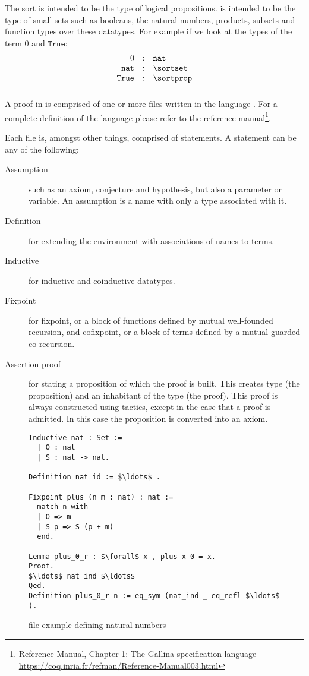 The sort \sortprop is intended to be the type of logical propositions.
\sortset is intended to be the type of small sets such as booleans, the natural numbers, products, subsets and function types over these datatypes.
For example if we look at the types of the term $0$ and $\texttt{True}$:
	\[
		\begin{array}{rcl}
			0 & : & \texttt{nat} \\
			\texttt{nat} & : & \sortset \\
			\texttt{True} & : & \sortprop
		\end{array}
	\]

\subsubsection{\gallina}

A proof in \coq is comprised of one or more files written in the \gallina language \cite{huet1992gallina}.
For a complete definition of the \gallina language please refer to the \coq reference manual\footnote{\coq Reference Manual, Chapter 1: The Gallina specification language\\ \url{https://coq.inria.fr/refman/Reference-Manual003.html}}.

Each file is, amongst other things, comprised of statements.
A statement can be any of the following:
\begin{description}
	\item[Assumption] such as an axiom, conjecture and hypothesis, but also a parameter or variable.
		An assumption is a name with only a type associated with it.
	\item[Definition] for extending the environment with associations of names to terms.
	\item[Inductive] for inductive and coinductive datatypes.
	\item[Fixpoint] for fixpoint, or a block of functions defined by mutual well-founded recursion, and cofixpoint, or a block of terms defined by a mutual guarded co-recursion.
	\item[Assertion proof] for stating a proposition of which the proof is built.
		This creates type (the proposition) and an inhabitant of the type (the proof).
		This proof is always constructed using tactics, except in the case that a proof is admitted.
		In this case the proposition is converted into an axiom.
\end{description}

\begin{figure}[H]
	\begin{lstlisting}[language=Coq, mathescape]
Inductive nat : Set :=
  | O : nat
  | S : nat -> nat.

Definition nat_id := $\ldots$ .

Fixpoint plus (n m : nat) : nat :=
  match n with
  | O => m
  | S p => S (p + m)
  end.

Lemma plus_0_r : $\forall$ x , plus x 0 = x.
Proof.
$\ldots$ nat_ind $\ldots$
Qed.
Definition plus_0_r n := eq_sym (nat_ind _ eq_refl $\ldots$ ).
	\end{lstlisting}
	\caption{\coq file example defining natural numbers}
\end{figure}

